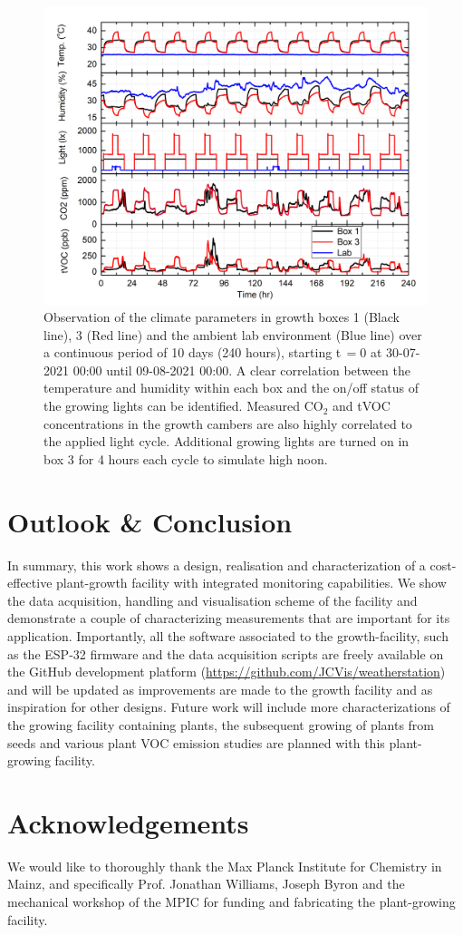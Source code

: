\documentclass[reprint,superscriptaddress,aps,amsmath,amssymb]{revtex4-1}
\begin{document}
\begin{figure}
    \centering
    \includegraphics[width = 1.2\textwidth, angle = -90]{10d measurement.jpg}
    \caption{Observation of the climate parameters in growth boxes 1 (Black line), 3 (Red line) and the ambient lab environment (Blue line) over a continuous period of 10 days (240 hours), starting t\,$=0$ at 30-07-2021 00:00 until 09-08-2021 00:00. A clear correlation between the temperature and humidity within each box and the on/off status of the growing lights can be identified. Measured CO$_2$ and tVOC concentrations in the growth cambers are also highly correlated to the applied light cycle. Additional growing lights are turned on in box 3 for 4 hours each cycle to simulate high noon.}
    \label{fig:long observation}
\end{figure}
\newpage

\section{Outlook \& Conclusion}
In summary, this work shows a design, realisation and characterization of a cost-effective plant-growth facility with integrated monitoring capabilities. We show the data acquisition, handling and visualisation scheme of the facility and demonstrate a couple of characterizing measurements that are important for its application. Importantly, all the software associated to the growth-facility, such as the ESP-32 firmware and the data acquisition scripts are freely available on the GitHub development platform (\url{https://github.com/JCVis/weatherstation}) and will be updated as improvements are made to the growth facility and as inspiration for other designs. Future work will include more characterizations of the growing facility containing plants, the subsequent growing of plants from seeds and various plant VOC emission studies are planned with this plant-growing facility.
\section*{Acknowledgements}
We would like to thoroughly thank the Max Planck Institute for Chemistry in Mainz, and specifically Prof. Jonathan Williams, Joseph Byron and the mechanical workshop of the MPIC for funding and fabricating the plant-growing facility.
\end{document}
